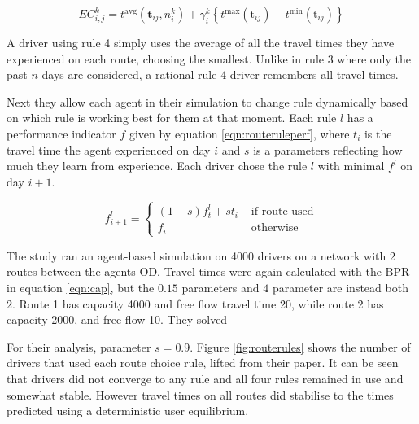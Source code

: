 \documentclass[12pt, a4paper, onecolumn]{article}
\begin{document}
\begin{equation}
	EC_{i,j}^{k} = t^{\mathrm{avg}}\left(\mathbf{t}_{i j}, n_{i}^{k}\right) + \gamma_{i}^{k}\left\{t^{\max }\left(\mathrm{t}_{i j}\right)-t^{\min }\left(\mathrm{t}_{i j}\right)\right\}
	\label{eqn:routerule3}
	\end{equation}

A driver using rule 4 simply uses the average of all the travel times they have experienced on each route, choosing the smallest. Unlike in rule 3 where only the past $n$ days are considered, a rational rule 4 driver remembers all travel times.

Next they allow each agent in their simulation to change rule dynamically based on which rule is working best for them at that moment. Each rule $l$ has a performance indicator $f$ given by equation \ref{eqn:routeruleperf}, where $t_{i}$ is the travel time the agent experienced on day $i$ and $s$ is a parameters reflecting how much they learn from experience. Each driver chose the rule $l$ with minimal $f^{l}$ on day $i+1$.

\begin{equation}
	f_{i+1}^l = \left\{\begin{array}{ll}(1-s) f_{t}^{l} + s t_{i} & \text { if route used} \\ f_{i} & \text { otherwise }\end{array}\right.
	\label{eqn:routeruleperf}
	\end{equation}

The study ran an agent-based simulation on 4000 drivers on a network with 2 routes between the agents OD. Travel times were again calculated with the BPR in equation \ref{eqn:cap}, but the $0.15$ parameters and $4$ parameter are instead both $2$. Route 1 has capacity 4000 and free flow travel time 20, while route 2 has capacity 2000, and free flow 10. They solved

For their analysis, parameter $s=0.9$. Figure \ref{fig:routerules} shows the number of drivers that used each route choice rule, lifted from their paper. It can be seen that drivers did not converge to any rule and all four rules remained in use and somewhat stable. However travel times on all routes did stabilise to the times predicted using a deterministic user equilibrium.
\end{document}
